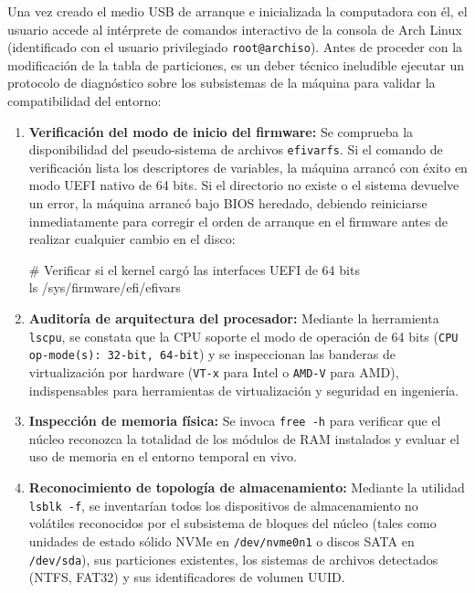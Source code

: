 \documentclass[12pt]{article}
\begin{document}
Una vez creado el medio USB de arranque e inicializada la computadora con él, el usuario accede al intérprete de comandos interactivo de la consola de Arch Linux (identificado con el usuario privilegiado \texttt{root@archiso}). Antes de proceder con la modificación de la tabla de particiones, es un deber técnico ineludible ejecutar un protocolo de diagnóstico sobre los subsistemas de la máquina para validar la compatibilidad del entorno:
\begin{enumerate}[noitemsep, topsep=2pt]
    \item \textbf{Verificación del modo de inicio del firmware:} Se comprueba la disponibilidad del pseudo-sistema de archivos \texttt{efivarfs}. Si el comando de verificación lista los descriptores de variables, la máquina arrancó con éxito en modo UEFI nativo de 64 bits. Si el directorio no existe o el sistema devuelve un error, la máquina arrancó bajo BIOS heredado, debiendo reiniciarse inmediatamente para corregir el orden de arranque en el firmware antes de realizar cualquier cambio en el disco:
    \begin{mdframed}[style=terminal]
    \ttfamily\upshape\color{bashLetterColor}\footnotesize
    \# Verificar si el kernel cargó las interfaces UEFI de 64 bits \\
    ls /sys/firmware/efi/efivars
    \end{mdframed}
    \item \textbf{Auditoría de arquitectura del procesador:} Mediante la herramienta \texttt{lscpu}, se constata que la CPU soporte el modo de operación de 64 bits (\texttt{CPU op-mode(s): 32-bit, 64-bit}) y se inspeccionan las banderas de virtualización por hardware (\texttt{VT-x} para Intel o \texttt{AMD-V} para AMD), indispensables para herramientas de virtualización y seguridad en ingeniería.
    \item \textbf{Inspección de memoria física:} Se invoca \texttt{free -h} para verificar que el núcleo reconozca la totalidad de los módulos de RAM instalados y evaluar el uso de memoria en el entorno temporal en vivo.
    \item \textbf{Reconocimiento de topología de almacenamiento:} Mediante la utilidad \texttt{lsblk -f}, se inventarían todos los dispositivos de almacenamiento no volátiles reconocidos por el subsistema de bloques del núcleo (tales como unidades de estado sólido NVMe en \texttt{/dev/\allowbreak nvme0n1} o discos SATA en \texttt{/dev/\allowbreak sda}), sus particiones existentes, los sistemas de archivos detectados (NTFS, FAT32) y sus identificadores de volumen UUID.
\end{enumerate}
\end{document}

